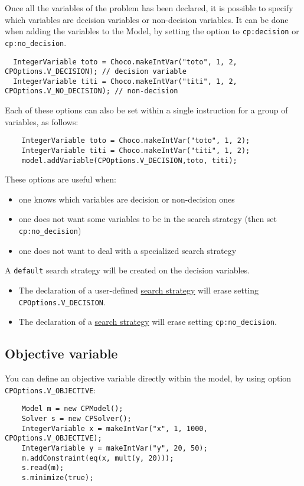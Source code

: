 Once all the variables of the problem has been declared, it is possible to specify which variables are decision variables or non-decision variables. It can be done when adding the variables to the Model, by setting the option to \texttt{cp:decision} or \texttt{cp:no\_decision}.
\begin{lstlisting}
  IntegerVariable toto = Choco.makeIntVar("toto", 1, 2, CPOptions.V_DECISION); // decision variable
  IntegerVariable titi = Choco.makeIntVar("titi", 1, 2, CPOptions.V_NO_DECISION); // non-decision
\end{lstlisting}
Each of these options can also be set within a single instruction for a group of variables, as follows: 
\begin{lstlisting}
	IntegerVariable toto = Choco.makeIntVar("toto", 1, 2);
	IntegerVariable titi = Choco.makeIntVar("titi", 1, 2);
	model.addVariable(CPOptions.V_DECISION,toto, titi);
\end{lstlisting}
These options are useful when:
\begin{itemize}
	\item one knows which variables are decision or non-decision ones
	\item one does not want some variables to be in the search strategy (then set \texttt{cp:no\_decision})
	\item one does not want to deal with a specialized search strategy
\end{itemize}
A \texttt{default} search strategy will be created on the decision variables. 
\begin{note}
  \begin{itemize}
  \item The declaration of a user-defined \hyperlink{solver:searchstrategy}{search strategy} will erase setting \texttt{CPOptions.V_DECISION}.
  \item The declaration of a \hyperlink{solver:searchstrategy}{search strategy} will erase setting \texttt{cp:no\_decision}.
  \end{itemize}
\end{note}

\subsection{Objective variable}\label{model:objectivevariable}\hypertarget{model:objectivevariable}{}
You can define an objective variable directly within the model, by using option \texttt{CPOptions.V_OBJECTIVE}:
\begin{lstlisting}
	Model m = new CPModel();
	Solver s = new CPSolver();
	IntegerVariable x = makeIntVar("x", 1, 1000, CPOptions.V_OBJECTIVE);
	IntegerVariable y = makeIntVar("y", 20, 50);
	m.addConstraint(eq(x, mult(y, 20)));
	s.read(m);
	s.minimize(true);
\end{lstlisting}


